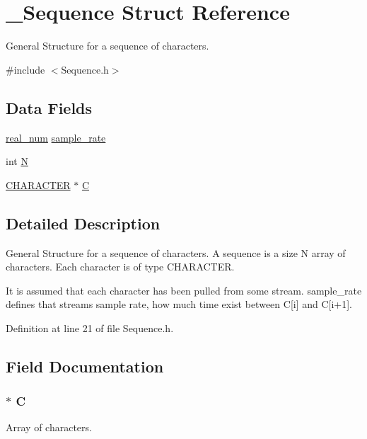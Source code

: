 \hypertarget{struct___sequence}{
\section{\_\-Sequence Struct Reference}
\label{struct___sequence}
}


General Structure for a sequence of characters.  




{\ttfamily \#include $<$Sequence.h$>$}

\subsection*{Data Fields}
\begin{DoxyCompactItemize}
\item 
\hyperlink{_constants_8h_afc78ec715915283bee8ffa1ecc5c3f4d}{real\_\-num} \hyperlink{struct___sequence_a699592f96d08e00211f2e1ae82cfeb60}{sample\_\-rate}
\item 
int \hyperlink{struct___sequence_a7722c8ecbb62d99aee7ce68b1752f337}{N}
\item 
\hyperlink{_constants_8h_abcd6b269a1786cbab40e964ed99a8724}{CHARACTER} $\ast$ \hyperlink{struct___sequence_ace6a083ab9219ee974a505ec2e08e9cc}{C}
\end{DoxyCompactItemize}


\subsection{Detailed Description}
General Structure for a sequence of characters. A sequence is a size N array of characters. Each character is of type CHARACTER.

It is assumed that each character has been pulled from some stream. sample\_\-rate defines that streams sample rate, how much time exist between C\mbox{[}i\mbox{]} and C\mbox{[}i+1\mbox{]}. 

Definition at line 21 of file Sequence.h.



\subsection{Field Documentation}
\hypertarget{struct___sequence_ace6a083ab9219ee974a505ec2e08e9cc}{
\subsubsection[{C}]{$\ast$ {\bf C}}}
\label{struct___sequence_ace6a083ab9219ee974a505ec2e08e9cc}
Array of characters. 

